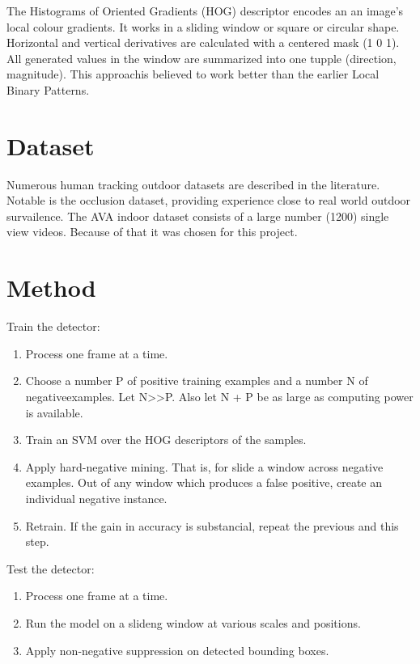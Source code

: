 \documentclass{article}
\begin{document}
The Histograms of Oriented Gradients (HOG)\cite{hog} descriptor encodes an an image's local colour gradients.
It works in a sliding window or square or circular shape.
Horizontal and vertical derivatives are calculated with a centered mask (1 0 1).
All generated values in the window are summarized into one tupple (direction, magnitude).
This approachis believed to work better than the earlier Local Binary Patterns.


\section{Dataset}
Numerous human tracking outdoor datasets are described in the literature\cite{datasets0}\cite{datasets1}.
Notable is the occlusion dataset\cite{datasets2}, providing experience close to real world outdoor survailence.
The AVA indoor dataset\cite{ava} consists of a large number (1200) single view videos.
Because of that it was chosen for this project.



\section{Method}
Train the detector:
\begin{enumerate}
\item{Process one frame at a time.}
\item{Choose a number P of positive training examples and a number N of negativeexamples. Let N>>P. Also let N + P be as large as computing power is available.}
\item{Train an SVM over the HOG descriptors of the samples.}
\item{Apply hard-negative mining. That is, for slide a window across negative examples. Out of any window which produces a false positive, create an individual negative instance.}
\item{Retrain. If the gain in accuracy is substancial, repeat the previous and this step.}
\end{enumerate}

Test the detector:
\begin{enumerate}
\item{Process one frame at a time.}
\item{Run the model on a slideng window at various scales and positions.}
\item{Apply non-negative suppression on detected bounding boxes.}
\end{enumerate}
\end{document}
